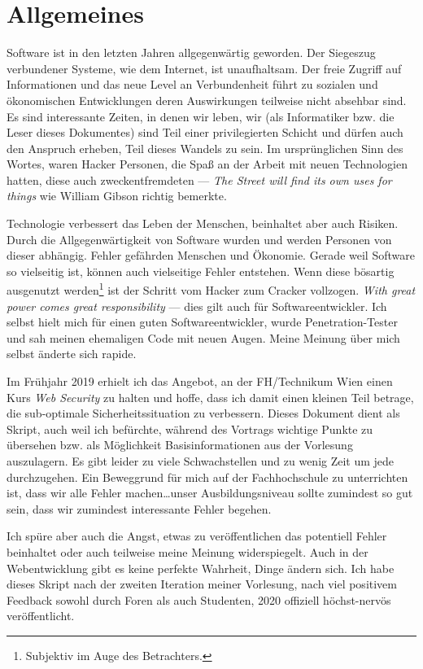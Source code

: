 \chapter{Allgemeines}

Software ist in den letzten Jahren allgegenwärtig geworden. Der Siegeszug verbundener Systeme, wie dem Internet,  ist unaufhaltsam. Der freie Zugriff auf Informationen und das neue Level an Verbundenheit führt zu sozialen und ökonomischen Entwicklungen deren Auswirkungen teilweise nicht absehbar sind. Es sind interessante Zeiten, in denen wir leben, wir (als Informatiker bzw. die Leser dieses Dokumentes) sind Teil einer privilegierten Schicht und dürfen auch den Anspruch erheben, Teil dieses Wandels zu sein. Im ursprünglichen Sinn des Wortes, waren Hacker Personen, die Spaß an der Arbeit mit neuen Technologien hatten, diese auch zweckentfremdeten --- \textit{The Street will find its own uses for things} wie William Gibson richtig bemerkte.

Technologie verbessert das Leben der Menschen, beinhaltet aber auch Risiken. Durch die Allgegenwärtigkeit von Software wurden und werden Personen von dieser abhängig. Fehler gefährden Menschen und Ökonomie. Gerade weil Software so vielseitig ist, können auch vielseitige Fehler entstehen. Wenn diese bösartig ausgenutzt werden\footnote{Subjektiv im Auge des Betrachters.} ist der Schritt vom Hacker zum Cracker vollzogen. \textit{With great power comes great responsibility} --- dies gilt auch für Softwareentwickler. Ich selbst hielt mich für einen guten Softwareentwickler, wurde Penetration-Tester und sah meinen ehemaligen Code mit neuen Augen. Meine Meinung über mich selbst änderte sich rapide.

Im Frühjahr 2019 erhielt ich das Angebot, an der FH/Technikum Wien einen Kurs \textit{Web Security} zu halten und hoffe, dass ich damit einen kleinen Teil betrage, die sub-optimale Sicherheitssituation zu verbessern. Dieses Dokument dient als Skript, auch weil ich befürchte, während des Vortrags wichtige Punkte zu übersehen bzw. als Möglichkeit Basisinformationen aus der Vorlesung auszulagern. Es gibt leider zu viele Schwachstellen und zu wenig Zeit um jede durchzugehen. Ein Beweggrund für mich auf der Fachhochschule zu unterrichten ist, dass wir alle Fehler machen\ldots unser Ausbildungsniveau sollte zumindest so gut sein, dass wir zumindest interessante Fehler begehen.

Ich spüre aber auch die Angst, etwas zu veröffentlichen das potentiell Fehler beinhaltet oder auch teilweise meine Meinung widerspiegelt. Auch in der Webentwicklung gibt es keine perfekte Wahrheit, Dinge ändern sich. Ich habe dieses Skript nach der zweiten Iteration meiner Vorlesung, nach viel positivem Feedback sowohl durch Foren als auch Studenten, 2020 offiziell höchst-nervös veröffentlicht.

